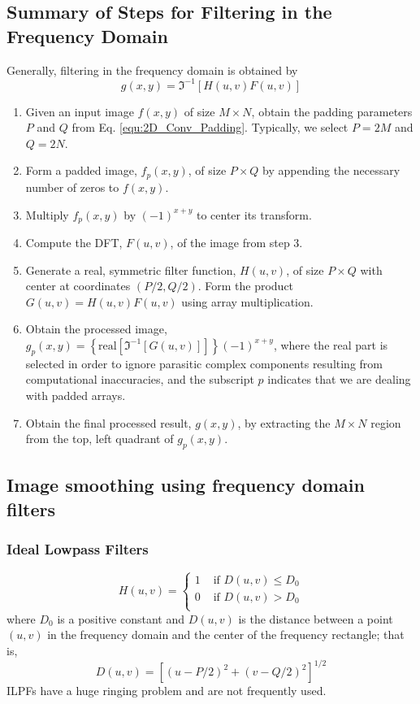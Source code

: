 \subsection{Summary of Steps for Filtering in the Frequency Domain }
Generally, filtering in the frequency domain is obtained by
\begin{equation}
	g(x,y) = \Im^{-1} \left[ H(u,v) F(u,v) \right]
\end{equation}

\begin{enumerate}
	\item Given an input image $f(x,y)$ of size $M \times N$, obtain the padding parameters $P$ and $Q$ from Eq. \ref{equ:2D_Conv_Padding}. Typically, we select $P=2M$ and $Q=2N$.
	\item Form a padded image, $f_p(x,y)$, of size $P \times Q$ by appending the necessary number of zeros to $f(x,y)$.
	\item Multiply $f_p(x,y)$ by $(-1)^{x+y}$ to center its transform.
	\item Compute the DFT, $F(u,v)$, of the image from step 3.
	\item Generate a real, symmetric filter function, $H(u,v)$, of size $P \times Q$ with center at coordinates $(P/2,Q/2)$. Form the product $G(u,v) = H(u,v) F(u,v)$ using array multiplication.
	\item Obtain the processed image, $g_p(x,y) = \left\lbrace \text{real} \left[ \Im^{-1} \left[ G(u,v) \right] \right] \right\rbrace (-1)^{x+y}$, where the real part is selected in order to ignore parasitic complex components resulting from computational inaccuracies, and the subscript $p$ indicates that we are dealing with padded arrays.
	\item Obtain the final processed result, $g(x,y)$, by extracting the $M \times N$ region from the top, left quadrant of $g_p(x,y)$.
\end{enumerate}

\subsection{Image smoothing using frequency domain filters }
\subsubsection{Ideal Lowpass Filters}
\begin{equation}
	H(u,v)  = 
		\begin{cases}
			1 & \text{  if } D(u,v) \leq D_0 \\
			0 & \text{  if } D(u,v) > D_0 \\ 
		\end{cases}
\end{equation}
where $D_0$ is a positive constant and $D(u,v)$ is the distance between a point $(u,v)$ in the frequency domain and the center of the frequency rectangle; that is,
\begin{equation}
	D(u,v) = \left[ (u-P/2)^2 + (v-Q/2)^2 \right]^{1/2}
	\label{equ:Freq_Filter_D_uv}
\end{equation}
ILPFs have a huge ringing problem and are not frequently used.

